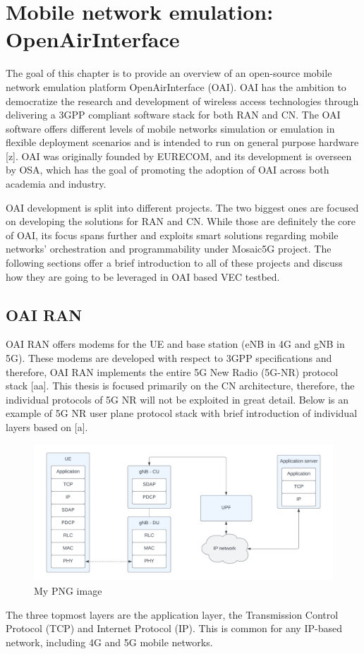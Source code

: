 \documentclass[12pt,a4paper,twoside]{report}
\begin{document}
\chapter{Mobile network emulation: \\OpenAirInterface}
The goal of this chapter is to provide an overview of an open-source mobile network emulation platform OpenAirInterface (OAI). OAI has the ambition to democratize the research and development of wireless access technologies through delivering a 3GPP compliant software stack for both RAN and CN. The OAI software offers different levels of mobile networks simulation or emulation in flexible deployment scenarios and is intended to run on general purpose hardware [z]. OAI was originally founded by EURECOM, and its development is overseen by OSA, which has the goal of promoting the adoption of OAI across both academia and industry. 

OAI development is split into different projects. The two biggest ones are focused on developing the solutions for RAN and CN. While those are definitely the core of OAI, its focus spans further and exploits smart solutions regarding mobile networks’ orchestration and programmability under Mosaic5G project. The following sections offer a brief introduction to all of these projects and discuss how they are going to be leveraged in OAI based VEC testbed.

\section{OAI RAN}
OAI RAN offers modems for the UE and base station (eNB in 4G and gNB in 5G). These modems are developed with respect to 3GPP specifications and therefore, OAI RAN implements the entire 5G New Radio (5G-NR) protocol stack [aa]. This thesis is focused primarily on the CN architecture, therefore, the individual protocols of 5G NR will not be exploited in great detail. Below is an example of 5G NR user plane protocol stack with brief introduction of individual layers based on [a].

\begin{figure}[ht]
	\centering
	\includegraphics[width=13cm]{./images/5G-NR-protstack.png} 
	\caption{My PNG image}
\end{figure}
The three topmost layers are the application layer, the Transmission Control Protocol (TCP) and Internet Protocol (IP). This is common for any IP-based network, including 4G and 5G mobile networks.
\end{document}
